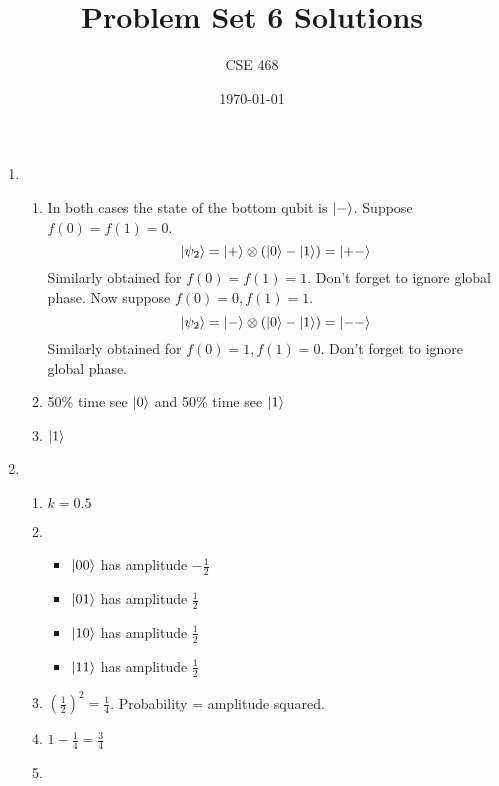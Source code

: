 \documentclass[12pt]{article}
\title{Problem Set 6 Solutions}
\author{CSE 468}
\date{\today}
\begin{document}
\maketitle

\begin{enumerate}[font=\bfseries]
    \item \begin{enumerate}
        \item In both cases the state of the bottom qubit is $\ket{-}$. Suppose $f(0) = f(1) = 0$.
        \[\ket{\psi_2} = \ket{+} \otimes (\ket{0} - \ket{1}) = \ket{+-}\]
        Similarly obtained for $f(0) = f(1) = 1$. Don't forget to ignore global phase.
        Now suppose $f(0) = 0, f(1) = 1$.
        \[\ket{\psi_2} = \ket{-} \otimes (\ket{0} - \ket{1}) = \ket{--}\]
        Similarly obtained for $f(0) = 1, f(1) = 0$. Don't forget to ignore global phase.
        \item 50\% time see $\ket{0}$ and 50\% time see $\ket{1}$
        \item $\ket{1}$
    \end{enumerate}
    \item \begin{enumerate}
        \item $k = 0.5$
    \item \begin{itemize}
        \item $\ket{00}$ has amplitude $-\frac{1}{2}$
        \item $\ket{01}$ has amplitude $\frac{1}{2}$
        \item $\ket{10}$ has amplitude $\frac{1}{2}$
        \item $\ket{11}$ has amplitude $\frac{1}{2}$
    \end{itemize}
    \item $(\frac{1}{2})^2 = \frac{1}{4}$. Probability = amplitude squared. 
    \item $1 - \frac{1}{4} = \frac{3}{4}$
    \item 
    \end{enumerate}
\end{enumerate}
\end{document}
